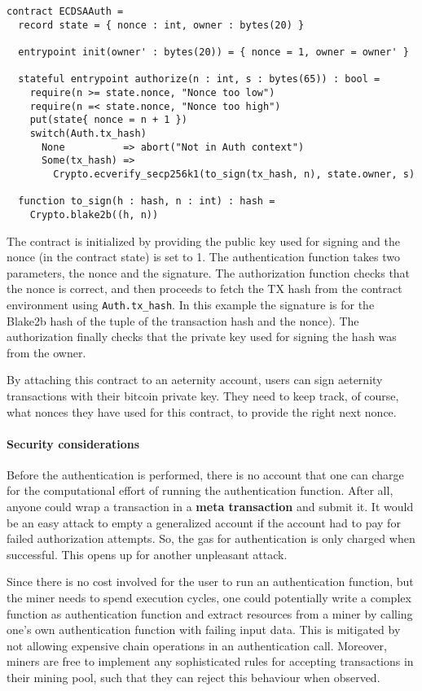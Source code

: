\begin{verbatim}
contract ECDSAAuth =
  record state = { nonce : int, owner : bytes(20) }

  entrypoint init(owner' : bytes(20)) = { nonce = 1, owner = owner' }

  stateful entrypoint authorize(n : int, s : bytes(65)) : bool =
    require(n >= state.nonce, "Nonce too low")
    require(n =< state.nonce, "Nonce too high")
    put(state{ nonce = n + 1 })
    switch(Auth.tx_hash)
      None          => abort("Not in Auth context")
      Some(tx_hash) =>
        Crypto.ecverify_secp256k1(to_sign(tx_hash, n), state.owner, s)

  function to_sign(h : hash, n : int) : hash =
    Crypto.blake2b((h, n))

\end{verbatim}

The contract is initialized by providing the public key used for
signing and the nonce (in the contract state) is set to 1. The
authentication function takes two parameters, the nonce and the signature.
The authorization function checks that the nonce is correct, and then
proceeds to fetch the TX hash from the contract environment using
\verb+Auth.tx_hash+. In this example the signature is for the Blake2b
hash of the tuple of the transaction hash and the nonce). The
authorization finally checks that the private key used for signing the
hash was from the owner.


By attaching this contract to an aeternity account, users can sign
aeternity transactions with their bitcoin private key. They need to
keep track, of course, what nonces they have used for this contract,
to provide the right next nonce.

\paragraph{Security considerations}

Before the authentication is performed, there is no account that one
can charge for the computational effort of running the authentication
function. After all, anyone could wrap a transaction in a \textbf{meta
  transaction} and submit it. It would be an easy attack to empty a
generalized account if the account had to pay for failed authorization
attempts. So, the gas for authentication is only charged when
successful. This opens up for another unpleasant attack.

Since there is no cost involved for the user to run an authentication
function, but the miner needs to spend execution cycles, one could
potentially write a complex function as authentication function and
extract resources from a miner by calling one's own authentication
function with failing input data. This is mitigated by not allowing
expensive chain operations in an authentication call. Moreover, miners
are free to implement any sophisticated rules for accepting
transactions in their mining pool, such that they can reject this
behaviour when observed.

